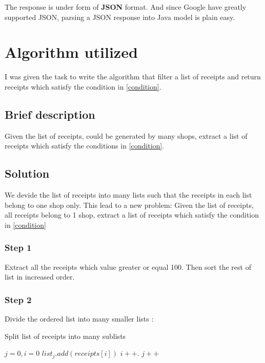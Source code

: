 The response is under form of \textbf{JSON} format. And since Google have greatly supported JSON, parsing a JSON response into Java model is plain easy.  


\section{Algorithm utilized}

I was given the task to write the algorithm that filter a list of receipts and return receipts which satisfy the condition in  \ref{condition}. 

\subsection{Brief description}
Given the list of receipts, could be generated by many shops, extract a list of receipts which satisfy the conditions in \ref{condition}.

\subsection{Solution}
We devide the list of receipts into many lists such that the receipts in each list belong to one shop only. This lead to a new problem: 
Given the list of receipts, all receipts belong to 1 shop, extract a list of receipts which satisfy the condition in \ref{condition}

\subsubsection{Step 1}
Extract all the receipts which value greater or equal 100. Then sort the rest of list in increased order.

\subsubsection{Step 2}
Divide the ordered list into many smaller lists :

\begin{algorithm}[H]
\caption{Split list of receipts into many sublists}
\begin{algorithmic}[1]
\State $j = 0, i = 0$
	\State $list_{j}.add(\textit{receipts}[i])$
	\State $i++$.
\Else
	\State $j++$
\EndIf
\EndWhile
\EndFunction
\end{algorithmic}
\end{algorithm}

